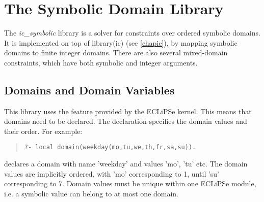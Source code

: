 %
% 
% 
% 
% 

\chapter{The Symbolic Domain Library}
\label{chapicsymbolic}



The {\em ic_symbolic} library is a solver for constraints over ordered
symbolic domains.
It is implemented on top of library(ic) (see \ref{chapic}),
by mapping symbolic domains to finite integer domains.
There are also several mixed-domain constraints, which have both
symbolic and integer arguments.

\section{Domains and Domain Variables}

This library uses the
feature provided by the ECLiPSe kernel. 
This means that domains need to be declared.
The declaration specifies the domain values and their order. For example:
\begin{quote}\begin{verbatim}
?- local domain(weekday(mo,tu,we,th,fr,sa,su)).
\end{verbatim}\end{quote}
declares a domain with name 'weekday' and values 'mo', 'tu' etc.  The
domain values are implicitly ordered, with 'mo' corresponding to 1,
until 'su' corresponding to 7.  Domain values must be unique within
one ECLiPSe module, i.e. a symbolic value can belong to at most one
domain.

